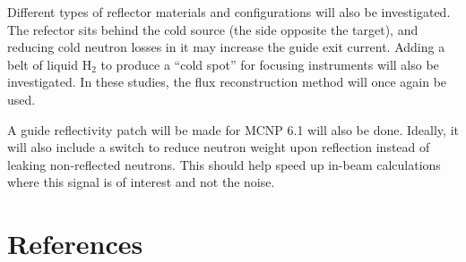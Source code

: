 \documentclass[a4paper]{jpconf}
\begin{document}
Different types of reflector materials and configurations will also be investigated.  The refector sits behind the cold source (the side opposite the target), and reducing cold neutron losses in it may increase the guide exit current.  Adding a belt of liquid H$_2$ to produce a ``cold spot'' for focusing instruments will also be investigated.  In these studies, the flux reconstruction method will once again be used.

A guide reflectivity patch will be made for MCNP 6.1 will also be done.  Ideally, it will also include a switch to reduce neutron weight upon reflection instead of leaking non-reflected neutrons. This should help speed up in-beam calculations where this signal is of interest and not the noise.

\section*{References}

\end{document}
